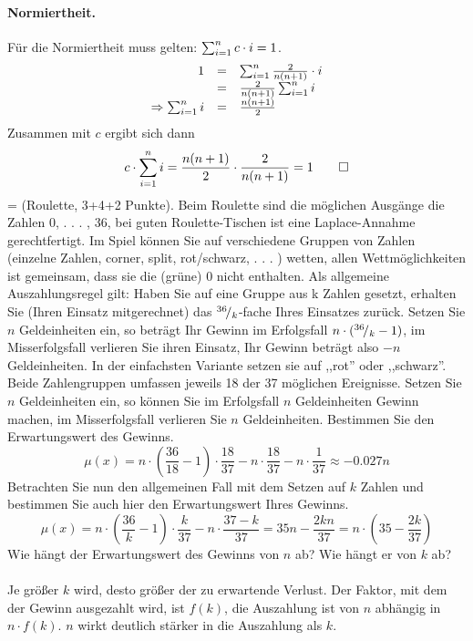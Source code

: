 \documentclass[twoside]{article}
\begin{document}
	\paragraph{Normiertheit.}
	Für die Normiertheit muss gelten: $\sum_{i= 1}^{n}c\cdot i=1$.
	\begin{equation*}
		\begin{array}{rll}
			1 	&=&	\sum_{i= 1}^{n} \frac{2}{n(n+1)}\cdot i\\
				&=&	\frac{2}{n(n+1)}\sum_{i= 1}^{n}i\\
				\Rightarrow \sum_{i= 1}^{n}i	&=& \frac{n(n+1)}{2}
		\end{array}
	\end{equation*}
	Zusammen mit $c$ ergibt sich dann
	\[
		c \cdot \sum_{i= 1}^{n}i = \frac{n(n+1)}{2} \cdot \frac{2}{n(n+1)} = 1 \qed
	\]
\fi
\ifnum\ZettelSechs=\True
{}
(Roulette, 3+4+2 Punkte).
Beim Roulette sind die möglichen Ausgänge die Zahlen {0, . . . , 36}, bei guten Roulette-Tischen ist eine Laplace-Annahme gerechtfertigt.
Im Spiel können Sie auf verschiedene Gruppen von Zahlen (einzelne Zahlen, corner, split, rot/schwarz, . . . ) wetten, allen Wettmöglichkeiten ist gemeinsam, dass sie die (grüne) 0 nicht enthalten.
Als allgemeine Auszahlungsregel gilt: Haben Sie auf eine Gruppe aus k Zahlen gesetzt, erhalten Sie (Ihren Einsatz mitgerechnet) das ${}^{36}\!/_{k}$-fache Ihres Einsatzes zurück.
Setzen Sie $n$ Geldeinheiten ein, so beträgt Ihr Gewinn im Erfolgsfall $n \cdot ({}^{36}\!/_{k}-1)$, im Misserfolgsfall verlieren Sie ihren Einsatz, Ihr Gewinn beträgt also $-n$ Geldeinheiten.
\sss
In der einfachsten Variante setzen sie auf ,,rot'' oder ,,schwarz''.
Beide Zahlengruppen umfassen jeweils 18 der 37 möglichen Ereignisse.
Setzen Sie $n$ Geldeinheiten ein, so können Sie im Erfolgsfall $n$ Geldeinheiten Gewinn machen, im Misserfolgsfall verlieren Sie $n$ Geldeinheiten.
Bestimmen Sie den Erwartungswert des Gewinns.
\[
	\mu(x) = n \cdot \left(\frac{36}{18}-1 \right) \cdot \frac{18}{37} - n \cdot \frac{18}{37} - n \cdot \frac{1}{37} \approx -0.027n
\]
\sss
Betrachten Sie nun den allgemeinen Fall mit dem Setzen auf $k$ Zahlen und bestimmen Sie auch hier den Erwartungswert Ihres Gewinns.
\[
	\mu(x) = n \cdot \left(\frac{36}{k}-1 \right) \cdot \frac{k}{37} - n \cdot \frac{37-k}{37} = 35n-\frac{2kn}{37} = n \cdot \left(35-\frac{2k}{37} \right)
\]
\sss
Wie hängt der Erwartungswert des Gewinns von $n$ ab?
Wie hängt er von $k$ ab?\\
\vspace{.2cm}\\
Je größer $k$ wird, desto größer der zu erwartende Verlust.
Der Faktor, mit dem der Gewinn ausgezahlt wird, ist $f(k)$, die Auszahlung ist von $n$ abhängig in $n \cdot f(k)$.
$n$ wirkt deutlich stärker in die Auszahlung als $k$.
\end{document}
